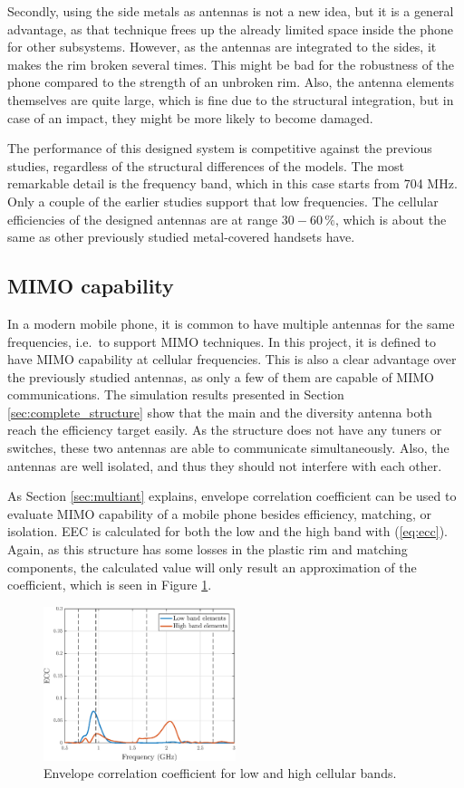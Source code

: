 Secondly, using the side metals as antennas is not a new idea, but it is a general advantage, as that technique frees up the already limited space inside the phone for other subsystems. However, as the antennas are integrated to the sides, it makes the rim broken several times. This might be bad for the robustness of the phone compared to the strength of an unbroken rim. Also, the antenna elements themselves are quite large, which is fine due to the structural integration, but in case of an impact, they might be more likely to become damaged.

The performance of this designed system is competitive against the previous studies, regardless of the structural differences of the models. The most remarkable detail is the frequency band, which in this case starts from 704 MHz. Only a couple of the earlier studies support that low frequencies. The cellular efficiencies of the designed antennas are at range $30-60\,\%$, which is about the same as other previously studied metal-covered handsets have.


\subsection{MIMO capability}
\label{sec:mimo_cap}
In a modern mobile phone, it is common to have multiple antennas for the same frequencies, i.e.\ to support MIMO techniques. In this project, it is defined to have MIMO capability at cellular frequencies. This is also a clear advantage over the previously studied antennas, as only a few of them are capable of MIMO communications. The simulation results presented in Section \ref{sec:complete_structure} show that the main and the diversity antenna both reach the efficiency target easily. As the structure does not have any tuners or switches, these two antennas are able to communicate simultaneously. Also, the antennas are well isolated, and thus they should not interfere with each other.

As Section \ref{sec:multiant} explains, envelope correlation coefficient can be used to evaluate MIMO capability of a mobile phone besides efficiency, matching, or isolation. EEC is calculated for both the low and the high band with (\ref{eq:ecc}). Again, as this structure has some losses in the plastic rim and matching components, the calculated value will only result an approximation of the coefficient, which is seen in Figure \ref{fig:ecc}. 
\begin{figure}[H]
    \centering
    \includegraphics[width=0.5\textwidth]{img/ecc.eps}
    \caption{Envelope correlation coefficient for low and high cellular bands.}
    \label{fig:ecc}
\end{figure}

